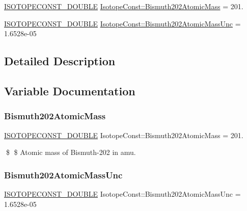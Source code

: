 \begin{DoxyCompactItemize}
\item 
\mbox{\hyperlink{group___isotope_const-_macros_ga8f45a7272ce02c0b4c65c44636ed719a}{I\+S\+O\+T\+O\+P\+E\+C\+O\+N\+S\+T\+\_\+\+D\+O\+U\+B\+LE}} \mbox{\hyperlink{group___isotope_const-_bismuth-_bi202_gadfb5fd782b9c4ae76fdf929f8aa87078}{Isotope\+Const\+::\+Bismuth202\+Atomic\+Mass}} = 201.
\item 
\mbox{\hyperlink{group___isotope_const-_macros_ga8f45a7272ce02c0b4c65c44636ed719a}{I\+S\+O\+T\+O\+P\+E\+C\+O\+N\+S\+T\+\_\+\+D\+O\+U\+B\+LE}} \mbox{\hyperlink{group___isotope_const-_bismuth-_bi202_ga43ca4bbc81a7a8c0b0c15ee4edbdfea2}{Isotope\+Const\+::\+Bismuth202\+Atomic\+Mass\+Unc}} = 1.\+6528e-\/05
\end{DoxyCompactItemize}


\subsection{Detailed Description}


\subsection{Variable Documentation}
\mbox{\label{group___isotope_const-_bismuth-_bi202_gadfb5fd782b9c4ae76fdf929f8aa87078}} 
\subsubsection{\texorpdfstring{Bismuth202\+Atomic\+Mass}{Bismuth202AtomicMass}}
{\footnotesize\ttfamily \mbox{\hyperlink{group___isotope_const-_macros_ga8f45a7272ce02c0b4c65c44636ed719a}{I\+S\+O\+T\+O\+P\+E\+C\+O\+N\+S\+T\+\_\+\+D\+O\+U\+B\+LE}} Isotope\+Const\+::\+Bismuth202\+Atomic\+Mass = 201.}

\$ \$ Atomic mass of Bismuth-\/202 in amu. \mbox{\label{group___isotope_const-_bismuth-_bi202_ga43ca4bbc81a7a8c0b0c15ee4edbdfea2}} 
\subsubsection{\texorpdfstring{Bismuth202\+Atomic\+Mass\+Unc}{Bismuth202AtomicMassUnc}}
{\footnotesize\ttfamily \mbox{\hyperlink{group___isotope_const-_macros_ga8f45a7272ce02c0b4c65c44636ed719a}{I\+S\+O\+T\+O\+P\+E\+C\+O\+N\+S\+T\+\_\+\+D\+O\+U\+B\+LE}} Isotope\+Const\+::\+Bismuth202\+Atomic\+Mass\+Unc = 1.\+6528e-\/05}

